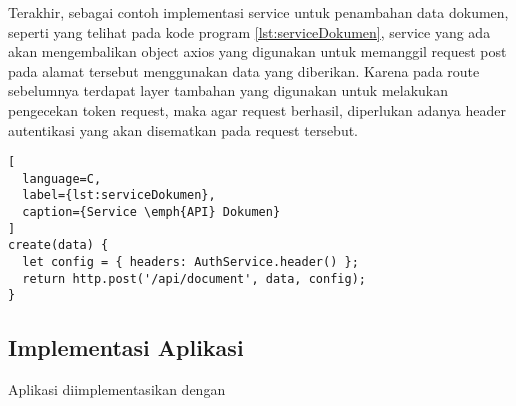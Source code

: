 Terakhir, sebagai contoh implementasi service untuk penambahan data dokumen, seperti yang telihat pada kode program \ref{lst:serviceDokumen}, service yang ada akan mengembalikan object axios yang digunakan untuk memanggil request post pada alamat tersebut menggunakan data yang diberikan.
Karena pada route sebelumnya terdapat layer tambahan yang digunakan untuk melakukan pengecekan token request, maka agar request berhasil, diperlukan adanya header autentikasi yang akan disematkan pada request tersebut.
\vspace{0.5ex}

\begin{lstlisting}[
  language=C,
  label={lst:serviceDokumen},
  caption={Service \emph{API} Dokumen}
]
create(data) {
  let config = { headers: AuthService.header() };
  return http.post('/api/document', data, config);
}
\end{lstlisting}
\vspace{0.5ex}

\subsection{Implementasi Aplikasi}
\vspace{1ex}

Aplikasi diimplementasikan dengan \lipsum[2]
\vspace{0.5ex}